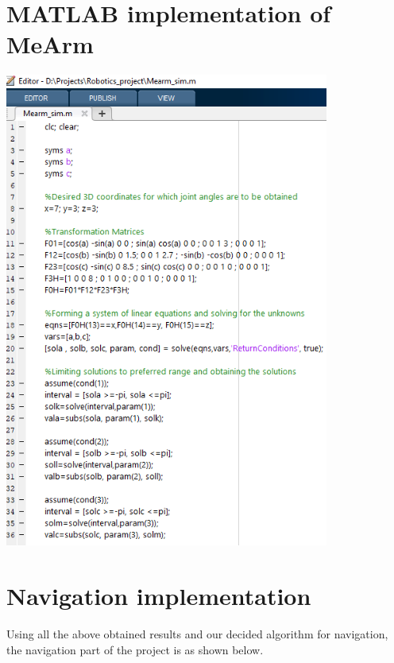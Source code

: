 \documentclass[12pt]{article}
\begin{document}
\section{MATLAB implementation of MeArm}
\begin{center}
\includegraphics[width=0.8\textwidth]{20.jpg}
\end{center}

\newpage

\section{Navigation implementation}
Using all the above obtained results and our decided algorithm for navigation, the navigation part of the project is as shown below.
\end{document}
